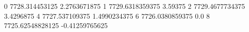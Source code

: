 0 7728.314453125 2.2763671875
1 7729.6318359375 3.59375
2 7729.4677734375 3.4296875
4 7727.537109375 1.4990234375
6 7726.0380859375 0.0
8 7725.62548828125 -0.41259765625
